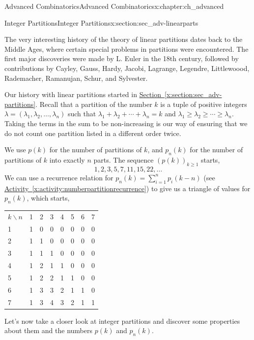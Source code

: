 \documentclass[oneside,10pt,]{book}
\numberwithin{equation}{chapter}
\newcommand{\hrulethin}  {\noalign{\hrule height 0.04em}}
\begin{document}
\begin{chapterptx}{Advanced Combinatorics}{}{Advanced Combinatorics}{}{}{x:chapter:ch_advanced}
\begin{sectionptx}{Integer Partitions}{}{Integer Partitions}{}{}{x:section:sec_adv-linearparts}
\begin{introduction}{}
The very interesting history of the theory of linear partitions dates back to the Middle Ages, where certain special problems in partitions were encountered.  The first major discoveries were made by L. Euler in the 18th century, followed by contributions by Cayley, Gauss, Hardy, Jacobi, Lagrange, Legendre, Littlewoood, Rademacher, Ramanujan, Schur, and Sylvester.%
\par
Our history with linear partitions started in \hyperref[x:section:sec_adv-partitions]{Section~\ref{x:section:sec_adv-partitions}}.  Recall that a partition of the number \(k\) is a tuple of positive integers \(\lambda = (\lambda_1, \lambda_2, \ldots, \lambda_n)\) such that \(\lambda_1 + \lambda_2 + \cdots + \lambda_n = k\) and \(\lambda_1 \ge \lambda_2 \ge \cdots \ge \lambda_n\).  Taking the terms in the sum to be non-increasing is our way of ensuring that we do not count one partition listed in a different order twice.%
\par
We use \(p(k)\) for the number of partitions of \(k\), and \(p_n(k)\) for the number of partitions of \(k\) into exactly \(n\) parts.  The sequence \((p(k))_{k \ge 1}\) starts,%
\begin{equation*}
1, 2, 3, 5, 7, 11, 15, 22,\ldots
\end{equation*}
We can use a recurrence relation for \(p_n(k) = \sum_{i=1}^n p_i(k-n)\) (see \hyperref[x:activity:numberpartitionrecurrence]{Activity~\ref{x:activity:numberpartitionrecurrence}}) to give us a triangle of values for \(p_n(k)\), which starts,%
\begin{sidebyside}{1}{0}{0}{0}%
\begin{sbspanel}{1}%
{\centering%
\begin{tabular}{llllllll}
\(k\backslash n\)&1&2&3&4&5&6&7\tabularnewline\hrulethin
1&1&0&0&0&0&0&0\tabularnewline[0pt]
2&1&1&0&0&0&0&0\tabularnewline[0pt]
3&1&1&1&0&0&0&0\tabularnewline[0pt]
4&1&2&1&1&0&0&0\tabularnewline[0pt]
5&1&2&2&1&1&0&0\tabularnewline[0pt]
6&1&3&3&2&1&1&0\tabularnewline[0pt]
7&1&3&4&3&2&1&1
\end{tabular}
\par}
\end{sbspanel}%
\end{sidebyside}%
\par
Let's now take a closer look at integer partitions and discover some properties about them and the numbers \(p(k)\) and \(p_n(k)\).%
\end{introduction}%
%
%
\typeout{************************************************}

\end{sectionptx}
\end{chapterptx}
\end{document}
